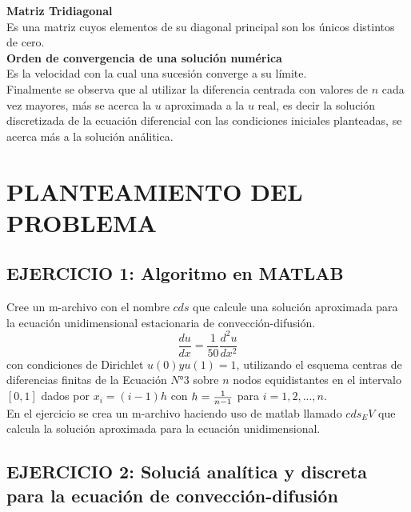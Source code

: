 \documentclass[paper=a4, parskip=full, fontsize=12pt]{scrartcl} %
\numberwithin{equation}{section} %
\numberwithin{figure}{section} %
\numberwithin{table}{section} %
\begin{document}
\textbf{Matriz Tridiagonal}\\
Es una matriz cuyos elementos de su diagonal principal son los \'unicos distintos de cero.\\

\textbf{Orden de convergencia de una soluci\'on num\'erica}\\
Es la velocidad con la cual una sucesi\'on converge a su l\'imite. \\

Finalmente se observa que al utilizar la diferencia centrada con valores de $n$ cada vez mayores, m\'as se acerca la $u$ aproximada a la $u$ real, es decir la soluci\'on discretizada de la ecuaci\'on diferencial con las condiciones iniciales planteadas, se acerca m\'as a la soluci\'on an\'alitica.  

\section{PLANTEAMIENTO DEL PROBLEMA}
\subsection{EJERCICIO 1: Algoritmo en MATLAB}

Cree un m-archivo con el nombre $cds$ que calcule una soluci\'on aproximada para la ecuaci\'on unidimensional estacionaria de convecci\'on-difusi\'on.\\

\begin{equation}
\frac { du }{ dx } =\frac { 1 }{ 50 } \frac { { d }^{ 2 }u }{ d{ x }^{ 2 } }
\end{equation}
con condiciones de Dirichlet $u(0) y u(1)=1$, utilizando el esquema centras de diferencias finitas de la Ecuaci\'on $N° 3$ sobre $n$ nodos equidistantes en el intervalo $[0,1]$ dados por $x_i=(i-1)h$ 
con $\\ h=\frac { 1 }{ n-1 }$ para $i= 1,2,...,n$.\\

En el ejercicio se crea un m-archivo haciendo uso de matlab llamado $cds_EV$ que calcula la soluci\'on aproximada para la ecuaci\'on unidimensional.\\

\subsection{EJERCICIO 2: Soluci\'a anal\'itica y discreta para la ecuación de convecci\'on-difusi\'on}
\end{document}
